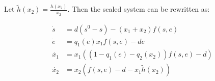 \documentclass[12pt]{article}
\begin{document}
\noindent Let $\tilde{h}(x_2) = \frac{h(x_2)}{x_2}.$ Then the scaled system can be rewritten as: 

\begin{align}
\dot{s}&=d(s^0-s)-(x_1 + x_2) f(s,e) \label{tildes}\\
\dot{e}&=q_1(e) x_1 f(s,e)-de\\
\dot{x_1} &= x_1((1-q_1(e)-q_2(x_2))f(s,e)-d)\\
\dot{x_2}&=x_2(f(s,e)-d-x_1 \tilde{h}(x_2))\label{tildef}
\end{align}





\begin{comment}

\noindent Notice that \textbf{N1} implies that $h(0)=h_1((1-q_1)s^0)=0$, and that $h_1(x_1)>0$ when $0<x_1<(1-q_1)s^0$.

\noindent Further assume \textbf{N3: } The function $h_1(x_1)$ is strictly concave down (i.e. $h''(x_1)<0$ for $0<x_1<(1-q_1)s^0$), and the equation $h(x_1)= d/ (1-q_1)$ has exactly two positive solutions $x_1^u$ and $x_1^s$ with $x_1^u<x_1^s$.

\textbf{Lemma 1: } \textit{Assume that \textbf{N1, N2} and \textbf{N3} holds. Then equation (\ref{x1only}) has 3 steady states, $0, x_1^u$ and $x_1^s$. The steady states $0$ and $x_1^s$ are asymptotically stable, and $x_1^u$ is unstable.}

\begin{proof}
The linearization at a steady state of \ref{x1only} is given by: 
\begin{align*}
J=\bigg((1-q_1)[h_1(x_1)+x_1h_1'(x_1)]-d \bigg)
\end{align*}
The determinant of the Jacobian is simply the only entry, so $$\det{(J)}=(1-q_1)[h_1(x_1)+x_1h_1'(x_1)]-d.$$ 
Calculating $\det{(J)}$ at each steady state reveals the stability of each. 

\noindent For $x_1=0$, $\det{(J)}=-d<0$, thus, $x_1=0$ is stable. 

\noindent Note that for $x_1^u$ and $x_1^s$, $h_1(x_1)=d/1-q_1$. Thus $\det{J}=(1-q_1)x_1h'(x_1^u)]$. For $x_1^u$, $h'(x_1^u)>0$, thus, $det{J}>0$ and must have a positive eigenvalue, implying that it is an unstable state. For $x_1^s$, $h'(x_1^s)<0$, and it is thus a stable point.  
\end{proof}

These boundary steady states are also steady states of the full system, thus, for $x_2=0$, we have the steady states of $(s,x_1,x_2)$ as $W=(0,0,0)$, $C_u=(s^u, x_1^u, 0)$ and $C_s=(s^s, x_1^s, 0)$. 


\end{comment}
\end{document}
